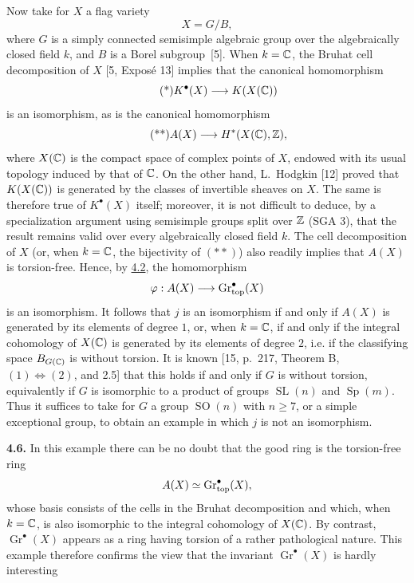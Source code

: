 Now take for $X$ a flag variety
\[
 X=G/B,
\]
where $G$ is a simply connected semisimple algebraic group over the
algebraically closed field $k$, and $B$ is a Borel subgroup~[5]. When
$k=\mathbb C$, the Bruhat cell decomposition of $X$ [5, Exposé 13] implies that
the canonical homomorphism
\begin{equation*}\tag{*}
 K^\bullet(X)\longrightarrow K(X(\mathbb C))
\end{equation*}
is an isomorphism, as is the canonical homomorphism
\begin{equation*}\tag{**}
 A(X)\longrightarrow H^*(X(\mathbb C),\mathbb Z),
\end{equation*}
where $X(\mathbb C)$ is the compact space of complex points of $X$, endowed with
its usual topology induced by that of $\mathbb C$. On the other hand, L.~Hodgkin
[12] proved that $K(X(\mathbb C))$ is generated by the classes of invertible
sheaves on $X$. The same is therefore true of $K^\bullet(X)$ itself;
moreover, it is not difficult to deduce, by a specialization argument using
semisimple groups split over $\mathbb Z$ (SGA 3), that the result remains valid
over every algebraically closed field $k$. The cell decomposition of $X$
(or, when $k=\mathbb C$, the bijectivity of $(**)$) also readily implies that
$A(X)$ is torsion-free. Hence, by \hyperlink{sga6.e14.para.4-2}{4.2}, the homomorphism
\[
 \varphi:A(X)\longrightarrow\operatorname{Gr}_{\mathrm{top}}^\bullet(X)
\]
is an isomorphism. It follows that $j$ is an isomorphism if and only if
$A(X)$ is generated by its elements of degree $1$, or, when $k=\mathbb C$, if and
only if the integral cohomology of $X(\mathbb C)$ is generated by its elements of
degree $2$, i.e. if the classifying space $B_{G(\mathbb C)}$ is without torsion. It
is known [15, p.~217, Theorem B, $(1)\Leftrightarrow(2)$, and 2.5] that this
holds if and only if $G$ is without torsion, equivalently if $G$ is
isomorphic to a product of groups $\operatorname{SL}(n)$ and
$\operatorname{Sp}(m)$. Thus it suffices to take for $G$ a group
$\operatorname{SO}(n)$ with $n\geq7$, or a simple exceptional group, to
obtain an example in which $j$ is not an isomorphism.

\noindent{}\textbf{4.6.}
In this example there can be no doubt that the good ring is the torsion-free
ring
\[
 A(X)\simeq\operatorname{Gr}_{\mathrm{top}}^\bullet(X),
\]
whose basis consists of the cells in the Bruhat decomposition and which,
when $k=\mathbb C$, is also isomorphic to the integral cohomology of $X(\mathbb C)$. By
contrast, $\operatorname{Gr}^\bullet(X)$ appears as a ring having torsion
of a rather pathological nature. This example therefore confirms the view
that the invariant $\operatorname{Gr}^\bullet(X)$ is hardly interesting

